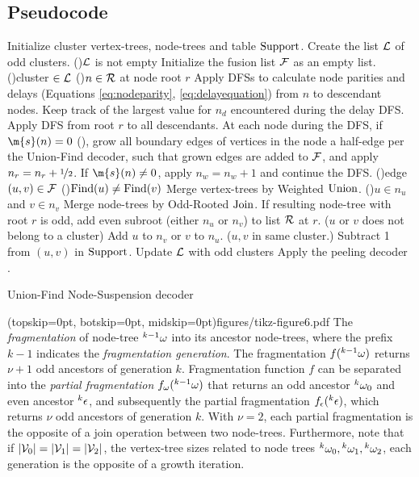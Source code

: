\subsection{Pseudocode}\label{sec:pseudocode}
\begin{algorithm}[htb]
  \BlankLine
  \BlankLine
  Initialize cluster vertex-trees, node-trees and table $\operatorname{Support}$.\;\label{algo:B1a}
  Create the list $\mathcal{L}$ of odd clusters.\;
  \While(){$\mathcal{L}$ is not empty}{
    Initialize the fusion list $\mathcal{F}$ as an empty list.\;\label{algo:B1b}
    \For(){cluster $\in\mathcal{L}$ \label{algo:B2a}}{
      \For(){$n \in\mathcal{R}$ at node root $r$}{
        Apply DFSs to calculate node parities and delays (Equations \eqref{eq:nodeparity}, \eqref{eq:delayequation}) from $n$ to descendant nodes. Keep track of the largest value for $n_d$ encountered during the delay DFS.\;\label{algo:pdc}
      }
      Apply DFS from root $r$ to all descendants. At each node during the DFS, if $\m{s}(n)=0$ (), grow all boundary edges of vertices in the node a half-edge per the Union-Find decoder, such that grown edges are added to $\mathcal{F}$, and apply $n_r=n_r+\nicefrac{1}{2}$. If $\m{s}(n)\neq0$, apply $n_w=n_w+1$ and continue the DFS.\;\label{algo:grow}
    }
    \For(){edge $(u,v) \in \mathcal{F}$\label{algo:B3a}}{
      \eIf(){$\operatorname{Find}(u)\neq\operatorname{Find}(v)$}{
        Merge vertex-trees by Weighted $\operatorname{Union}$.\;
        \eIf(){$u \in n_u$ and $v \in n_v$\label{algo:joina}}{
          Merge node-trees by Odd-Rooted $\operatorname{Join}$. If resulting node-tree with root $r$ is odd, add even subroot (either $n_u$ or $n_v$) to list $\mathcal{R}$ at $r$.\;
        }($u$ or $v$ does not belong to a cluster){
          Add $u$ to $n_v$ or $v$ to $n_u$.\;\label{algo:joinb}
        }
      }($u,v$ in same cluster.\label{algo:dfa}){
        Subtract 1 from $(u,v)$ in $\operatorname{Support}$.\;\label{algo:dfb}
      }
    }
    Update $\mathcal{L}$ with odd clusters\; \label{algo:B3b}
  }
  Apply the peeling decoder \cite{delfosse2017linear}.\label{algo:B4a}
  \caption{Union-Find Node-Suspension decoder}\label{algo:ufbb}
\end{algorithm}

\Figure[hbt](topskip=0pt, botskip=0pt, midskip=0pt){figures/tikz-figure6.pdf}{
  The \emph{fragmentation} of node-tree ${}^{k-1}\omega$ into its ancestor node-trees, where the prefix $k-1$ indicates the \emph{fragmentation generation}. The fragmentation $f({}^{k-1}\omega)$ returns $\nu+1$ odd ancestors of generation $k$. Fragmentation function $f$ can be separated into the \emph{partial fragmentation} $f_\omega({}^{k-1}\omega)$ that returns an odd ancestor ${}^{k}\omega_0$ and even ancestor ${}^{k}\epsilon$, and subsequently the partial fragmentation $f_\epsilon({}^{k}\epsilon)$, which returns $\nu$ odd ancestors of generation $k$. With $\nu=2$, each partial fragmentation is the opposite of a join operation between two node-trees. Furthermore, note that if $\lvert\mathcal{V}_0\rvert = \lvert\mathcal{V}_1\rvert = \lvert\mathcal{V}_2\rvert$, the vertex-tree sizes related to node trees ${}^{k}\omega_0, {}^{k}\omega_1, {}^{k}\omega_2$, each generation is the opposite of a growth iteration. \label{fig6}}

